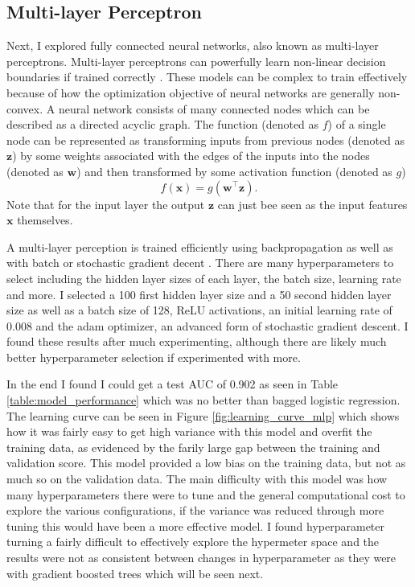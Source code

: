 \documentclass[11pt]{article}
\begin{document}
\subsection*{Multi-layer Perceptron}
Next, I explored fully connected neural networks, also known as multi-layer perceptrons. 
Multi-layer perceptrons can powerfully learn non-linear decision boundaries if trained correctly \cite{ramchoun_multilayer_2016}.
These models can be complex to train effectively because of how the optimization objective of neural networks are generally non-convex.
A neural network consists of many connected nodes which can be described as a directed acyclic graph. 
The function (denoted as $f$) of a single node can be represented as transforming inputs from previous nodes (denoted as $\bm{z}$) by some weights associated with the edges of the inputs into the nodes (denoted as $\bm{w}$) and then transformed by some activation function (denoted as $g$)
\[
    f(\bm{x}) = g(\bm{w}^\top \bm{z}).
\] 
Note that for the input layer the output $\bm{z}$ can just bee seen as the input features $\bm{x}$ themselves.

A multi-layer perception is trained efficiently using backpropagation as well as with batch or stochastic gradient decent \cite{ramchoun_multilayer_2016}.
There are many hyperparameters to select including the hidden layer sizes of each layer, the batch size, learning rate and more.
I selected a 100 first hidden layer size and a 50 second hidden layer size as well as a batch size of 128, ReLU activations, an initial learning rate of 0.008 and the adam optimizer, an advanced form of stochastic gradient descent.
I found these results after much experimenting, although there are likely much better hyperparameter selection if experimented with more.

In the end I found I could get a test AUC of 0.902 as seen in Table \ref{table:model_performance} which was no better than bagged logistic regression.
The learning curve can be seen in Figure \ref{fig:learning_curve_mlp} which shows how it was fairly easy to get high variance with this model and overfit the training data, as evidenced by the farily large gap between the training and validation score. 
This model provided a low bias on the training data, but not as much so on the validation data.
The main difficulty with this model was how many hyperparameters there were to tune and the general computational cost to explore the various configurations, if the variance was reduced through more tuning this would have been a more effective model.
I found hyperparameter turning a fairly difficult to effectively explore the hypermeter space and the results were not as consistent between changes in hyperparameter as they were with gradient boosted trees which will be seen next.
\end{document}
